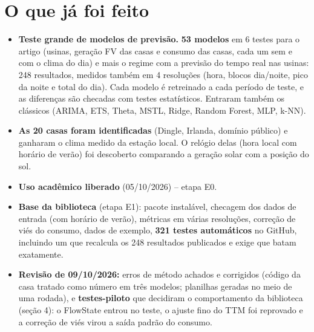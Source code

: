 \documentclass[10pt,a4paper]{article}
\begin{document}
\section{O que já foi feito}
\begin{itemize}
  \item \textbf{Teste grande de modelos de previsão.} \textbf{53 modelos} em 6 testes para o artigo (usinas,
        geração FV das casas e consumo das casas, cada um sem e com o clima do dia) e mais o regime com a
        previsão do tempo real nas usinas: 248 resultados, medidos também em 4 resoluções (hora, blocos
        dia/noite, pico da noite e total do dia). Cada modelo é retreinado a cada período de teste,
        e as diferenças são checadas com testes estatísticos. Entraram também os clássicos (ARIMA, ETS,
        Theta, MSTL, Ridge, Random Forest, MLP, k-NN).
  \item \textbf{As 20 casas foram identificadas} (Dingle, Irlanda, domínio público) e ganharam o clima
        medido da estação local. O relógio delas (hora local com horário de verão) foi descoberto
        comparando a geração solar com a posição do sol.
  \item \textbf{Uso acadêmico liberado} (05/10/2026) -- etapa E0.
  \item \textbf{Base da biblioteca} (etapa E1): pacote instalável, checagem dos dados de entrada (com
        horário de verão), métricas em várias resoluções, correção de viés do consumo, dados de exemplo,
        \textbf{321 testes automáticos} no GitHub, incluindo um que recalcula os 248 resultados publicados e
        exige que batam exatamente.
  \item \textbf{Revisão de 09/10/2026:} erros de método achados e corrigidos (código da casa tratado como
        número em três modelos; planilhas geradas no meio de uma rodada), e \textbf{testes-piloto} que
        decidiram o comportamento da biblioteca (seção 4): o FlowState entrou no teste, o ajuste fino do TTM
        foi reprovado e a correção de viés virou a saída padrão do consumo.
\end{itemize}

\end{document}
